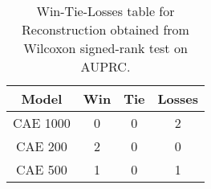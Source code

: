 \begin{table}
\centering
\caption{Win-Tie-Losses table for Reconstruction obtained from Wilcoxon signed-rank test on AUPRC.}
\label{tab:reconstruction_model_training_data_comparison_AUPRC}
\begin{tabular}{|c|c|c|c|}
\toprule
\textbf{Model} &  \textbf{Win} &  \textbf{Tie} &  \textbf{Losses} \\
\midrule
      CAE 1000 &             0 &             0 &                2 \\
       CAE 200 &             2 &             0 &                0 \\
       CAE 500 &             1 &             0 &                1 \\
\bottomrule
\end{tabular}
\end{table}
